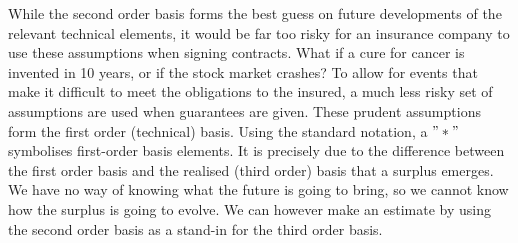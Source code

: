 \documentclass[12pt]{article}
\theoremstyle{my_thm}
\begin{document}
While the second order basis forms the best guess on future developments of the relevant technical elements, it would be far too risky for an insurance company to use these assumptions when signing contracts. What if a cure for cancer is invented in 10 years, or if the stock market crashes? To allow for events that make it difficult to meet the obligations to the insured, a much less risky set of assumptions are used when guarantees are given. These prudent assumptions form the first order (technical) basis. Using the standard notation, a $"*"$ symbolises first-order basis elements. It is precisely due to the difference between the first order basis and the realised (third order) basis that a surplus emerges. We have no way of knowing what the future is going to bring, so we cannot know how the surplus is going to evolve. We can however make an estimate by using the second order basis as a stand-in for the third order basis.
\end{document}

